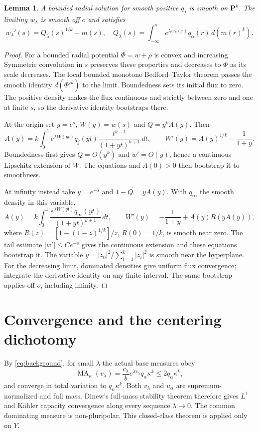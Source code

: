 \documentclass[11pt]{article}
\newcommand{\MA}{\operatorname{MA}}
\newtheorem{lemma}[theorem]{Lemma}
\theoremstyle{remark}\newtheorem{remark}[theorem]{Remark}
\begin{document}
\begin{lemma}\label{lem:radial}
A bounded radial solution for smooth positive $q_j$ is smooth on
$\mathbf P^k$. The limiting $w_\lambda$ is smooth off $o$ and satisfies
\[
 w_\lambda'(s)=Q_\lambda(s)^{1/k}-m(s),\quad
 Q_\lambda(s)=\int_{-\infty}^s
                   e^{\lambda w_\lambda(r)}q_\alpha(r)\,d(m(r)^k).
\]
\end{lemma}
\begin{proof}
For a bounded radial potential $\Phi=w+\rho$ is convex and increasing.
Symmetric convolution in $s$ preserves these properties and decreases
to $\Phi$ as its scale decreases. The local bounded monotone
Bedford--Taylor theorem \cite{BT} passes the smooth identity
$d(\Phi'^k)$ to the limit. Boundedness sets its initial flux to zero.
The positive density makes the flux continuous and strictly between zero
and one at finite $s$, so the derivative identity bootstraps there.

At the origin set $y=e^s$, $W(y)=w(s)$ and $Q=y^k A(y)$. Then
\[
 A(y)=k\int_0^1e^{\lambda W(yt)}q_j(yt)
                  \frac{t^{k-1}}{(1+yt)^{k+1}}\,dt,\qquad
 W'(y)=A(y)^{1/k}-\frac1{1+y}.
\]
Boundedness first gives $Q=O(y^k)$ and $w'=O(y)$, hence a continuous
Lipschitz extension of $W$. The equations and $A(0)>0$ then bootstrap
it to smoothness.

At infinity instead take $y=e^{-s}$ and $1-Q=yA(y)$. With $q_\infty$
the smooth density in this variable,
\[
 A(y)=k\int_0^1\frac{e^{\lambda W(yt)}q_\infty(yt)}
                              {(1+yt)^{k+1}}\,dt,\qquad
 W'(y)=-\frac1{1+y}+A(y)R(yA(y)),
\]
where $R(z)=[1-(1-z)^{1/k}]/z$, $R(0)=1/k$, is smooth near zero.
The tail estimate $|w'|\leq Ce^{-s}$ gives the continuous extension
and these equations bootstrap it. The variable
$y=|z_0|^2/\sum_{i=1}^k|z_i|^2$ is smooth near the hyperplane.
For the decreasing limit, dominated densities give uniform flux
convergence; integrate the derivative identity on any finite interval.
The same bootstrap applies off $o$, including infinity.
\end{proof}

\section{Convergence and the centering dichotomy}
By \eqref{eq:background}, for small $\lambda$ the actual base measures obey
\[
 \MA_\kappa(v_\lambda)
  =\frac{c_\lambda}{b}e^{\lambda v_\lambda}q_\alpha\kappa^k
  \leq2q_\alpha\kappa^k,
\]
and converge in total variation to $q_\alpha\kappa^k$.
Both $v_\lambda$ and $u_\alpha$ are supremum-normalized and full mass.
Dinew's full-mass stability theorem \cite[Theorem 1.3]{Dinew} therefore
gives $L^1$ and K\"ahler capacity convergence along every sequence
$\lambda\to0$. The common dominating measure is non-pluripolar.
This closed-class theorem is applied only on $Y$.
\end{document}
